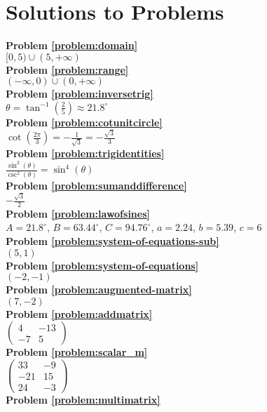 \chapter{Solutions to Problems}
\textbf{Problem \ref{problem:domain}} \\
$[0,5)\cup (5, +\infty)$
\\
\textbf{Problem \ref{problem:range}} \\
$(-\infty,0)\cup (0, +\infty)$
\\
\textbf{Problem \ref{problem:inversetrig}} \\
$\theta=\tan^{-1}(\frac{2}{5})\approx 21.8^{\circ}$ 
\\
\textbf{Problem \ref{problem:cotunitcircle}} \\
$\cot(\frac{2\pi}{3})=- \frac{1}{\sqrt{3}}=-\frac{\sqrt{3}}{3}$ 
\\
\textbf{Problem \ref{problem:trigidentities}} \\
$\frac{\sin^2(\theta)}{\csc^2(\theta)}=\sin^4(\theta)$ 
\\
\textbf{Problem \ref{problem:sumanddifference}} \\
$-\frac{\sqrt{3}}{2}$ 
\\
\textbf{Problem \ref{problem:lawofsines}} \\
$A=21.8^{\circ}$,
$B=63.44^{\circ}$,
$C=94.76^{\circ}$,
$a=2.24$,
$b=5.39$,
$c=6$ 
\\
\textbf{Problem \ref{problem:system-of-equations-sub}} \\
$(5,1)$ 
\\
\textbf{Problem \ref{problem:system-of-equations}} \\
$(-2,-1)$ 
\\
\textbf{Problem \ref{problem:augmented-matrix}} \\
$(7,-2)$ 
\\
\textbf{Problem \ref{problem:addmatrix}} \\
$
\begin{pmatrix}
4 & -13 \\
-7 & 5
\end{pmatrix}
$ 
\\
\textbf{Problem \ref{problem:scalar_m}} \\
$
\begin{pmatrix}
33 & -9 \\
-21 & 15 \\
24 & -3 
\end{pmatrix} 
$ 
\\
\textbf{Problem \ref{problem:multimatrix}} \\
